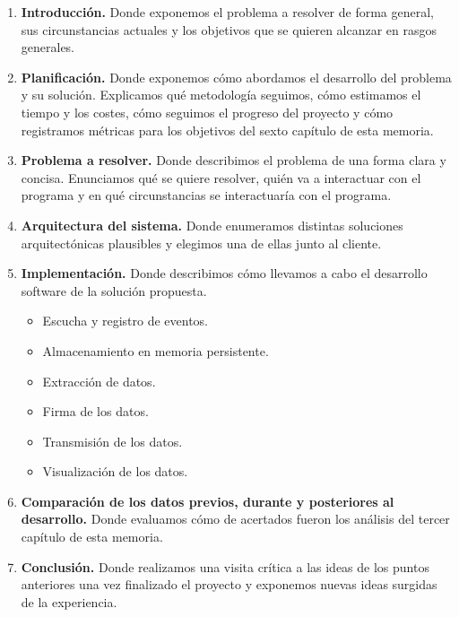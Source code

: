 \begin{enumerate}
    \item \textbf{Introducción.} Donde exponemos el problema a resolver de forma general,
    sus circunstancias actuales y los objetivos que se quieren alcanzar en rasgos generales.

    \item \textbf{Planificación.} Donde exponemos cómo abordamos el desarrollo del problema y su solución.
    Explicamos qué metodología seguimos, cómo estimamos el tiempo y los costes, cómo seguimos el progreso
    del proyecto y cómo registramos métricas para los objetivos del sexto capítulo de esta memoria.

    \item \textbf{Problema a resolver.} Donde describimos el problema de una forma clara y concisa.
    Enunciamos qué se quiere resolver, quién va a interactuar con el programa y en qué circunstancias
    se interactuaría con el programa.

    \item \textbf{Arquitectura del sistema.} Donde enumeramos distintas soluciones arquitectónicas
    plausibles y elegimos una de ellas junto al cliente.

    \item \textbf{Implementación.} Donde describimos cómo llevamos a cabo el desarrollo software
    de la solución propuesta.
    \begin{itemize}
        \item Escucha y registro de eventos.
        \item Almacenamiento en memoria persistente.
        \item Extracción de datos.
        \item Firma de los datos.
        \item Transmisión de los datos.
        \item Visualización de los datos.
    \end{itemize}

    \item \textbf{Comparación de los datos previos, durante y posteriores al desarrollo.} Donde evaluamos cómo de
    acertados fueron los análisis del tercer capítulo de esta memoria.

    \item \textbf{Conclusión.} Donde realizamos una visita crítica a las ideas de los puntos
    anteriores una vez finalizado el proyecto y exponemos nuevas ideas surgidas de la experiencia.
\end{enumerate}
